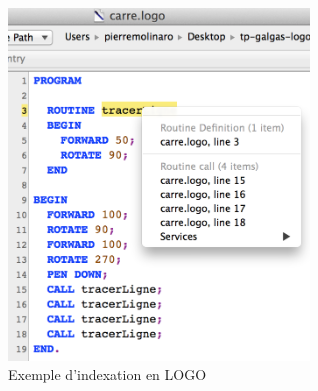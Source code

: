 \begin{figure}[!t]
  \centering
  \includegraphics[width=8cm]{chapitre-cocoa-features/exemple-indexation-logo.png}
  \caption{Exemple d'indexation en LOGO}
  \ligne
\end{figure}



%
%
%
%
%
%
%
%
%
%
%
%
%
%
%
%







